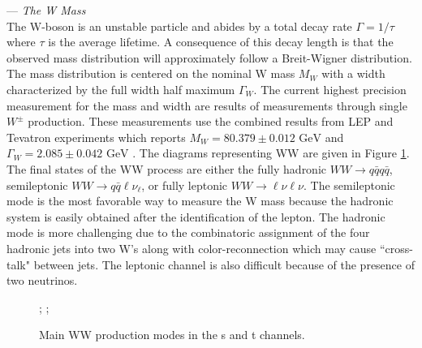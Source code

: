 --- \textit {The W Mass}\\
The W-boson is an unstable particle and abides by a total decay rate $\Gamma = 1/\tau$ where $\tau$ is the average lifetime.  A consequence of this decay length is that the observed mass distribution will approximately follow a Breit-Wigner distribution. The mass distribution is centered on the nominal W mass $M_W$ with a width characterized by the full width half maximum $\Gamma_W$. The current highest precision measurement for the mass and width are results of measurements through single $W^\pm$ production. These measurements use the combined results from LEP and Tevatron experiments which reports $M_W = 80.379 \pm 0.012 \, \, \text{GeV} $ and $\Gamma_W = 2.085 \pm 0.042 \,  \,\text{GeV}$ \cite{pdg}. The diagrams representing WW are given in Figure \ref{fig:wwdiag}. The final states of the WW process are either the fully hadronic $WW\rightarrow q\bar{q}q\bar{q}$, semileptonic $WW\rightarrow q\bar{q}\ell\nu_{\ell}$, or fully leptonic $WW\rightarrow \ell \nu \ell \nu$. The semileptonic mode is the most favorable way to measure the W mass because the hadronic system is easily obtained after the identification of the lepton. The hadronic mode is more challenging due to the combinatoric assignment of the four hadronic jets into two W's along with color-reconnection which may cause ``cross-talk" between jets. The leptonic channel is also difficult because of the presence of two neutrinos.


\begin{figure}
\centering
{};
    ;
\caption{\label{fig:wwdiag} Main WW production modes in the s and t channels. }
\end{figure}

  

